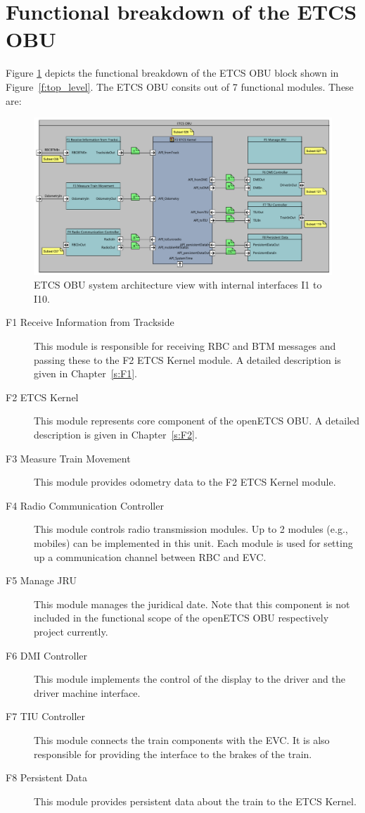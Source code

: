 \section{Functional breakdown of the ETCS OBU}

Figure \ref{f:ETCS_OBU_decomposition} depicts the functional breakdown of the ETCS OBU block shown in Figure~\ref{f:top_level}. The ETCS OBU consits out of 7 functional modules. These are:
\begin{figure}
\centering
\includegraphics[width=\textwidth]{images/F2_ETCS_Kernel.pdf}
\caption{ETCS OBU system architecture view with internal interfaces I1 to I10.}
\label{f:ETCS_OBU_decomposition}
\end{figure}
\begin{description}
\item[F1 Receive Information from Trackside] This module is responsible for receiving RBC and BTM messages and passing these to the F2 ETCS Kernel module. A detailed description is given in Chapter~\ref{s:F1}.
\item[F2 ETCS Kernel] This module represents core component of the openETCS OBU. A detailed description is given in Chapter~\ref{s:F2}.
\item[F3 Measure Train Movement] This module provides odometry data to the F2 ETCS Kernel module.
\item[F4 Radio Communication Controller] This module controls radio transmission modules. Up to 2 modules (e.g., mobiles) can be implemented in this unit. Each module is used for setting up a communication channel between RBC and EVC. 
\item[F5 Manage JRU] This module manages the juridical date. Note that this component is not included in the functional scope of the openETCS OBU respectively project currently.
\item[F6 DMI Controller] This module implements the control of the display to the driver and the driver machine interface. 
\item[F7 TIU Controller] This module connects the train components with the EVC. It is also responsible for providing the interface to the brakes of the train.
\item[F8 Persistent Data] This module provides persistent data about the train to the ETCS Kernel.
\end{description}

